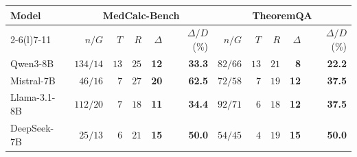 \begin{tabular*}{\textwidth}{@{\extracolsep{\fill}}lrrrrrrrrrr@{}}
\toprule
Model & \multicolumn{5}{c}{MedCalc-Bench} & \multicolumn{5}{c}{TheoremQA} \\
\cmidrule(lr){2-6}\cmidrule(l){7-11}
 & $n/G$ & $T$ & $R$ & $\Delta$ & $\Delta/D$ (\%) & $n/G$ & $T$ & $R$ & $\Delta$ & $\Delta/D$ (\%) \\
\midrule
Qwen3-8B & $134/14$ & $13$ & $25$ & \textbf{12} & \textbf{33.3} & $82/66$ & $13$ & $21$ & \textbf{8} & \textbf{22.2} \\
Mistral-7B & $46/16$ & $7$ & $27$ & \textbf{20} & \textbf{62.5} & $72/58$ & $7$ & $19$ & \textbf{12} & \textbf{37.5} \\
Llama-3.1-8B & $112/20$ & $7$ & $18$ & \textbf{11} & \textbf{34.4} & $92/71$ & $6$ & $18$ & \textbf{12} & \textbf{37.5} \\
DeepSeek-7B & $25/13$ & $6$ & $21$ & \textbf{15} & \textbf{50.0} & $54/45$ & $4$ & $19$ & \textbf{15} & \textbf{50.0} \\
\bottomrule
\end{tabular*}
